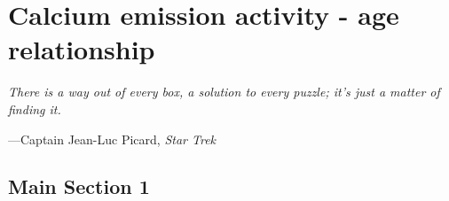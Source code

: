 
\chapter{Calcium emission activity - age relationship} %

\label{Chapter4} %


\epigraph{\itshape There is a way out of every box, a solution to every puzzle; it's just a matter of finding it.}{---Captain Jean-Luc Picard, \itshape Star Trek}

\section{Main Section 1}

\lipsum[1-3]